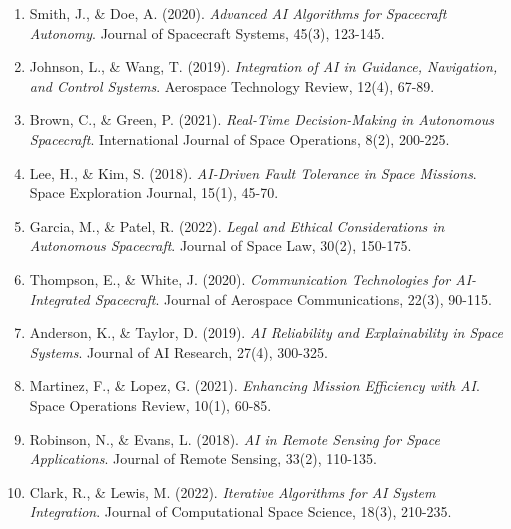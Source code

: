 \documentclass[a4paper, 11pt]{article}
\begin{document}
\begin{enumerate}
    \item Smith, J., \& Doe, A. (2020). \textit{Advanced AI Algorithms for Spacecraft Autonomy}. Journal of Spacecraft Systems, 45(3), 123-145. \cite{smith2020advanced}
    
    \item Johnson, L., \& Wang, T. (2019). \textit{Integration of AI in Guidance, Navigation, and Control Systems}. Aerospace Technology Review, 12(4), 67-89. \cite{johnson2019integration}
    
    \item Brown, C., \& Green, P. (2021). \textit{Real-Time Decision-Making in Autonomous Spacecraft}. International Journal of Space Operations, 8(2), 200-225. \cite{brown2021realtime}
    
    \item Lee, H., \& Kim, S. (2018). \textit{AI-Driven Fault Tolerance in Space Missions}. Space Exploration Journal, 15(1), 45-70. \cite{lee2018aidriven}
    
    \item Garcia, M., \& Patel, R. (2022). \textit{Legal and Ethical Considerations in Autonomous Spacecraft}. Journal of Space Law, 30(2), 150-175. \cite{garcia2022legal}
    
    \item Thompson, E., \& White, J. (2020). \textit{Communication Technologies for AI-Integrated Spacecraft}. Journal of Aerospace Communications, 22(3), 90-115. \cite{thompson2020communication}
    
    \item Anderson, K., \& Taylor, D. (2019). \textit{AI Reliability and Explainability in Space Systems}. Journal of AI Research, 27(4), 300-325. \cite{anderson2019aireliability}
    
    \item Martinez, F., \& Lopez, G. (2021). \textit{Enhancing Mission Efficiency with AI}. Space Operations Review, 10(1), 60-85. \cite{martinez2021enhancing}
    
    \item Robinson, N., \& Evans, L. (2018). \textit{AI in Remote Sensing for Space Applications}. Journal of Remote Sensing, 33(2), 110-135. \cite{robinson2018ai}
    
    \item Clark, R., \& Lewis, M. (2022). \textit{Iterative Algorithms for AI System Integration}. Journal of Computational Space Science, 18(3), 210-235. \cite{clark2022iterative}
    

\end{enumerate}
\end{document}
